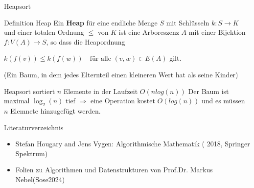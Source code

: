 \documentclass{beamer}
\begin{document}
\begin{frame}{Heapsort}
\begin{block}{Definition Heap}
 Ein \textbf{Heap} für eine endliche Menge $S$ mit Schlüsseln $k: S \to K$ und einer totalen Ordnung $\leq$ von $K$ ist eine Arboreszenz $A$ mit einer Bijektion $f: V(A) \to S$, so dass die Heapordnung
 
$k(f(v)) \leq k(f(w)) \quad \text{für alle } (v, w) \in E(A) $
gilt.
\end{block}
\begin{block}{}
(Ein Baum, in dem jedes Elternteil einen kleineren Wert hat als seine Kinder)
\end{block}
\begin{block}{Heapsort sortiert $n$ Elemente in der Laufzeit $O(nlog(n))$}
Der Baum ist maximal $\log_2(n)$ tief $\Rightarrow$ eine Operation kostet $O(log(n))$ und es müssen $n$ Elemnete hinzugefügt werden.
\end{block}
\end{frame}
\begin{frame}{Literaturverzeichnis}
\begin{itemize}
    \item Stefan Hougary and Jens Vygen: Algorithmische Mathematik ( 2018, Springer Spektrum)
    \item Folien zu Algorithmen und Datenstrukturen von Prof.Dr. Markus Nebel(Sose2024)
\end{itemize}
\end{frame}
\end{document}
